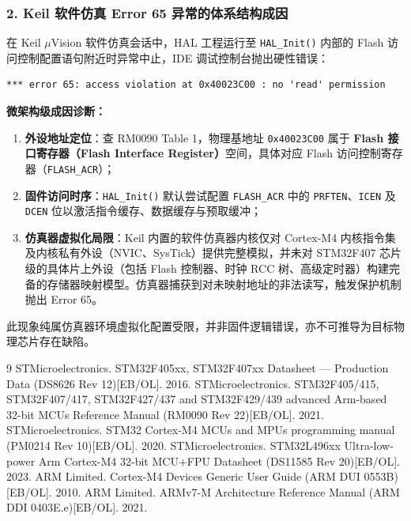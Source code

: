 \documentclass[11pt,a4paper]{ctexart}
\begin{document}
\subsubsection*{2. Keil 软件仿真 Error 65 异常的体系结构成因}
在 Keil $\mu$Vision 软件仿真会话中，HAL 工程运行至 \texttt{HAL\_Init()} 内部的 Flash 访问控制配置语句附近时异常中止，IDE 调试控制台抛出硬性错误：
\begin{lstlisting}[style=plain]
*** error 65: access violation at 0x40023C00 : no 'read' permission
\end{lstlisting}

\textbf{微架构级成因诊断：}
\begin{enumerate}[label=\textbf{\arabic*.}]
  \item \textbf{外设地址定位}：查 RM0090 Table 1，物理基地址 \texttt{0x40023C00} 属于 \textbf{Flash 接口寄存器（Flash Interface Register）}空间，具体对应 Flash 访问控制寄存器（\texttt{FLASH\_ACR}）；
  \item \textbf{固件访问时序}：\texttt{HAL\_Init()} 默认尝试配置 \texttt{FLASH\_ACR} 中的 \texttt{PRFTEN}、\texttt{ICEN} 及 \texttt{DCEN} 位以激活指令缓存、数据缓存与预取缓冲；
  \item \textbf{仿真器虚拟化局限}：Keil 内置的软件仿真器内核仅对 Cortex-M4 内核指令集及内核私有外设（NVIC、SysTick）提供完整模拟，并未对 STM32F407 芯片级的具体片上外设（包括 Flash 控制器、时钟 RCC 树、高级定时器）构建完备的存储器映射模型。仿真器捕获到对未映射地址的非法读写，触发保护机制抛出 Error 65。
\end{enumerate}
此现象纯属仿真器环境虚拟化配置受限，并非固件逻辑错误，亦不可推导为目标物理芯片存在缺陷。

\clearpage
{}
\begingroup\small
\begin{thebibliography}{9}
\setlength{\itemsep}{3pt}
 STMicroelectronics. STM32F405xx, STM32F407xx Datasheet --- Production Data (DS8626 Rev 12)[EB/OL]. 2016.
 STMicroelectronics. STM32F405/415, STM32F407/417, STM32F427/437 and STM32F429/439 advanced Arm-based 32-bit MCUs Reference Manual (RM0090 Rev 22)[EB/OL]. 2021.
 STMicroelectronics. STM32 Cortex-M4 MCUs and MPUs programming manual (PM0214 Rev 10)[EB/OL]. 2020.
 STMicroelectronics. STM32L496xx Ultra-low-power Arm Cortex-M4 32-bit MCU+FPU Datasheet (DS11585 Rev 20)[EB/OL]. 2023.
 ARM Limited. Cortex-M4 Devices Generic User Guide (ARM DUI 0553B)[EB/OL]. 2010.
 ARM Limited. ARMv7-M Architecture Reference Manual (ARM DDI 0403E.e)[EB/OL]. 2021.
\end{thebibliography}
\endgroup
\end{document}
